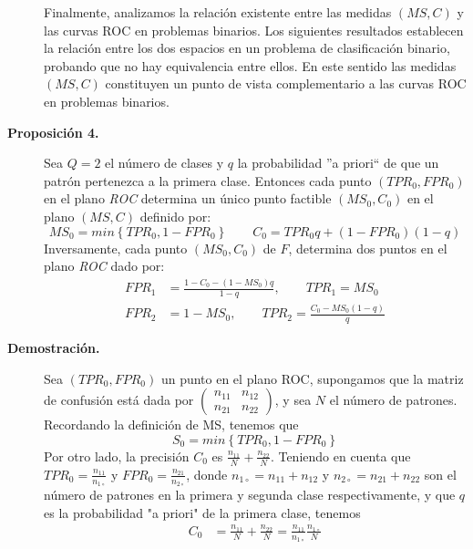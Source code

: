 \begin{description}
Finalmente, analizamos la relación existente entre las medidas $(MS,C)$ y las curvas
ROC en problemas binarios. Los siguientes resultados establecen la relación
entre los dos espacios en un problema de clasificación binario, probando que no hay
equivalencia entre ellos. En este sentido las medidas $(MS,C)$ constituyen un punto de vista
complementario a las curvas ROC en problemas binarios.
\item[\textbf{Proposición 4.}] Sea $Q=2$ el número de clases y $q$ la probabilidad ''a
priori`` de que un patrón pertenezca a la primera clase. Entonces cada punto
$(TPR_{0},FPR_{0})$ en el plano \textit{ROC} determina un único punto factible
$(MS_{0},C_{0})$ en el plano $(MS,C)$ definido por:
\begin{displaymath}
MS_{0}	=min\left\lbrace TPR_{0}, 1-FPR_{0}\right\rbrace \qquad
C_{0}=TPR_{0}q+(1-FPR_{0})(1-q)
\end{displaymath}
Inversamente, cada punto $(MS_{0},C_{0})$ de $F$, determina dos puntos en el plano
\textit{ROC} dado por:
\begin{align}
	FPR_{1}&=\frac{1-C_{0}-(1-MS_{0})q}{1-q},\qquad TPR_{1}=MS_{0} \nonumber \\
	FPR_{2}&=1-MS_{0}, \qquad TPR_{2}=\frac{C_{0}-MS_{0}(1-q)}{q} \nonumber
\end{align}
\item[\textbf{Demostración.}] Sea $\displaystyle (TPR_{0},FPR_{0})$ un punto en el
plano ROC, supongamos que la matriz de confusión está dada por $\left( \begin{array}{cc}
n_{11} & n_{12}\\
n_{21} & n_{22}
\end{array}\right) $, y sea $N$ el número de patrones. Recordando la definición de
MS, tenemos que
\begin{equation}\label{p4-1}
S_{0}=min\left\lbrace TPR_{0}, 1-FPR_{0}\right\rbrace
\end{equation}
Por otro lado, la precisión $C_{0}$ es $\displaystyle \frac{n_{11}}{N}+\frac{n_{22}}{N}$.
Teniendo
en cuenta que $\displaystyle TPR_{0}=\frac{n_{11}}{n_{1\circ}}$ y
$FPR_{0}=\frac{n_{21}}{n_{2\circ}}$, donde $n_{1\circ}=n_{11}+n_{12}$ y
$n_{2\circ}=n_{21}+n_{22}$ son
el número de patrones en la primera y segunda clase respectivamente, y que $q$ es la
probabilidad "a priori" de la primera clase, tenemos
\begin{equation}\label{p4-2}
\begin{split}
C_{0}&=\frac{n_{11}}{N}+\frac{n_{22}}{N}=\frac{n_{11}}{n_{1\circ}}\frac{n_{1\circ}}{N}

\end{split}
\end{equation}
\end{description}
